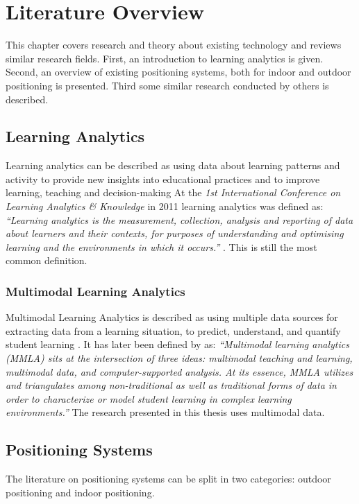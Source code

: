 \documentclass[../Main/thesis.tex]{subfiles}
\begin{document}
\chapter{Literature Overview}
\label{ch:literature_overview}
This chapter covers research and theory about existing technology and reviews similar research fields.
First, an introduction to learning analytics is given.
Second, an overview of existing positioning systems, both for indoor and outdoor positioning is presented.
Third some similar research conducted by others is described.

\section{Learning Analytics} 
Learning analytics can be described as using data about learning patterns and activity to provide new insights into educational practices and to improve learning, teaching and decision-making \citep{Siemens2012a}
At the \textit{1st International Conference on Learning Analytics \& Knowledge} in 2011 learning analytics was defined as: \textit{``Learning analytics is the measurement, collection, analysis and reporting of data about learners and their contexts, for purposes of understanding and optimising learning and the environments in which it occurs.''} \citep{BuckinghamShum2012}.
This is still the most common definition.


\subsection*{Multimodal Learning Analytics}
Multimodal Learning Analytics is described as using multiple data sources for extracting data from a learning situation, to predict, understand, and quantify student learning \citep{Worsley2010}.
It has later been defined by \citet{Worsley2016} as: \textit{``Multimodal learning analytics (MMLA) sits at the intersection of three ideas: multimodal teaching and learning, multimodal data, and computer-supported analysis. At its essence, MMLA utilizes and triangulates among non-traditional as well as traditional forms of data in order to characterize or model student learning in complex learning environments.''}
The research presented in this thesis uses multimodal data.

\section{Positioning Systems}
The literature on positioning systems can be split in two categories: outdoor positioning and indoor positioning.
\end{document}

